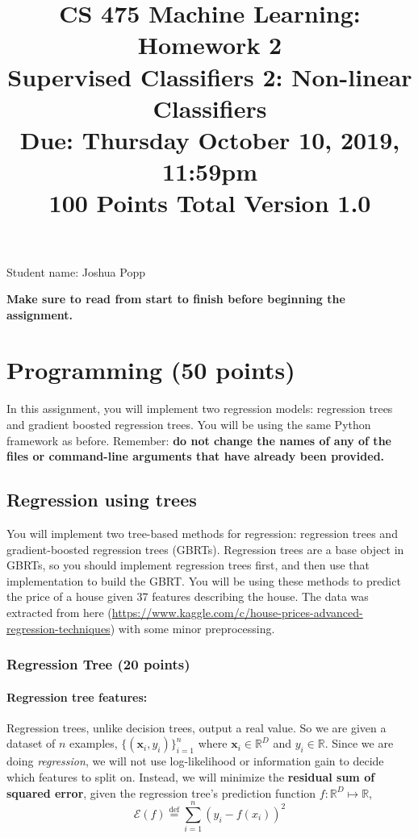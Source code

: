 \documentclass[11pt]{article}
\title{CS 475 Machine Learning: Homework 2\\
Supervised Classifiers 2: Non-linear Classifiers\\
\Large{Due: Thursday October 10, 2019, 11:59pm}\\
100 Points Total \hspace{1cm} Version 1.0}
\author{}
\date{}
\newcommand{\defeq}{\overset{\text{def}}{=}}
\begin{document}
\large
\maketitle
\thispagestyle{headings}

\vspace{-.5in}


\begin{answertext}{2cm}{}\centering
  Student name:  Joshua Popp \\

\end{answertext}

{\bf Make sure to read from start to finish before beginning the assignment.}
\section{Programming (50 points)}
In this assignment, you will implement two regression models: regression trees and gradient boosted regression trees.
You will be using the same Python framework as before. Remember: \textbf{do not change the names of any of the files or command-line arguments that have already been provided.}

\subsection{Regression using trees}
You will implement two tree-based methods for regression: regression trees and gradient-boosted regression trees (GBRTs). Regression trees are a base object in GBRTs, so you should implement regression trees first, and then use that implementation to build the GBRT. You will be using these methods to predict the price of a house given 37 features describing the house. The data was extracted from here (\url{https://www.kaggle.com/c/house-prices-advanced-regression-techniques}) with some minor preprocessing.


\subsubsection{Regression Tree (20 points)}
\paragraph{Regression tree features:}

Regression trees, unlike decision trees, output a real value.  So we are given a
dataset of $n$ examples, $\{ (\boldsymbol{x}_i, y_i) \}^n_{i=1}$ where
$\boldsymbol{x}_i \in \mathbb{R}^D$ and $y_i \in \mathbb{R}$.  Since we are
doing \emph{regression}, we will not use log-likelihood or information gain to
decide which features to split on.  Instead, we will minimize the
\textbf{residual sum of squared error}, given the regression tree's prediction
function $f: \mathbb{R}^D \mapsto \mathbb{R}$,
\begin{equation}\label{eq:rss}
  \mathcal{E}(f) \defeq \sum_{i=1}^n (y_i - f(x_i))^2
\end{equation}
\end{document}
